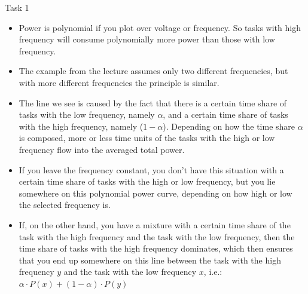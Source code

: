 \begin{frame}[allowframebreaks]{Task 1}{}
{\begin{Sidenote}
\begin{itemize}
        \item Power is \alert{polynomial} if you plot over voltage or frequency. So tasks with high frequency will consume polynomially more power than those with low frequency.
        \item The example from the lecture assumes only \alert{two} different frequencies, but with more different frequencies the principle is similar.
        \item The line we see is caused by the fact that there is a certain time share of tasks with the low frequency, namely $\alpha$, and a certain time share of tasks with the high frequency, namely ($1-\alpha$). Depending on how the time share $\alpha$ is composed, more or less time units of the tasks with the high or low frequency flow into the averaged total power.
      \end{itemize}
    \end{Sidenote}
    \framebreak
    \begin{Sidenote}
      \begin{itemize}
        \item If you leave the frequency constant, you don't have this situation with a certain time share of tasks with the high or low frequency, but you lie somewhere on this polynomial power curve, depending on how high or low the selected frequency is.
        \item If, on the other hand, you have a mixture with a certain time share of the task with the high frequency and the task with the low frequency, then the time share of tasks with the high frequency dominates, which then ensures that you end up somewhere on this line between the task with the high frequency $y$ and the task with the low frequency $x$, i.e.: $\alpha \cdot P(x) + (1-\alpha) \cdot P(y)$
      \end{itemize}
    \end{Sidenote}
  }\fi
\end{frame}
